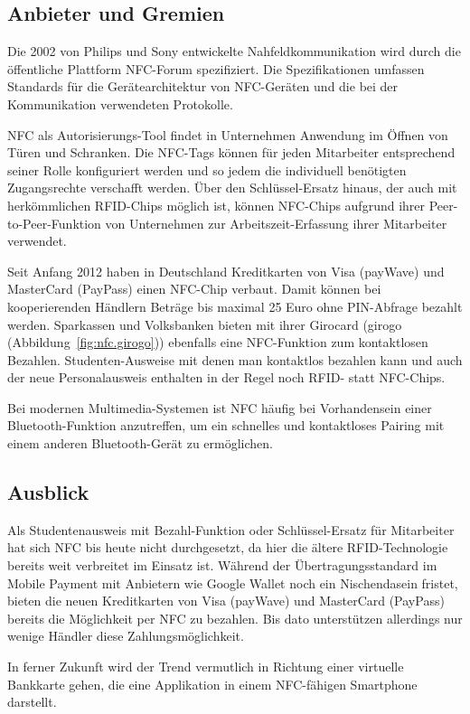 \begin{multicols}{3}

\subsection*{Anbieter und Gremien}
Die 2002 von Philips und Sony entwickelte Nahfeldkommunikation wird durch die öffentliche Plattform NFC-Forum spezifiziert. Die Spezifikationen umfassen Standards für die Gerätearchitektur von NFC-Geräten und die bei der Kommunikation verwendeten Protokolle.

NFC als Autorisierungs-Tool findet in Unternehmen Anwendung im Öffnen von Türen und Schranken. Die NFC-Tags können für jeden Mitarbeiter entsprechend seiner Rolle konfiguriert werden und so jedem die individuell benötigten Zugangsrechte verschafft werden. Über den Schlüssel-Ersatz hinaus, der auch mit herkömmlichen RFID-Chips möglich ist, können NFC-Chips aufgrund ihrer Peer-to-Peer-Funktion von Unternehmen zur Arbeitszeit-Erfassung ihrer Mitarbeiter verwendet.

Seit Anfang 2012 haben in Deutschland Kreditkarten von Visa (payWave) und MasterCard (PayPass) einen NFC-Chip verbaut. Damit können bei kooperierenden Händlern Beträge bis maximal 25 Euro ohne PIN-Abfrage bezahlt werden. Sparkassen und Volksbanken bieten mit ihrer Girocard (girogo (Abbildung~\ref{fig:nfc.girogo})) ebenfalls eine NFC-Funktion zum kontaktlosen Bezahlen.
Studenten-Ausweise mit denen man kontaktlos bezahlen kann und auch der neue Personalausweis enthalten in der Regel noch RFID- statt NFC-Chips.

Bei modernen Multimedia-Systemen ist NFC häufig bei Vorhandensein einer Bluetooth-Funktion anzutreffen, um ein schnelles und kontaktloses Pairing mit einem anderen Bluetooth-Gerät zu ermöglichen.~\cite{nfc.2,nfc.11,nfc.12}


\subsection*{Ausblick}
Als Studentenausweis mit Bezahl-Funktion oder Schlüssel-Ersatz für Mitarbeiter hat sich NFC bis heute nicht durchgesetzt, da hier die ältere RFID-Technologie bereits weit verbreitet im Einsatz ist. Während der Übertragungsstandard im Mobile Payment mit Anbietern wie Google Wallet noch ein Nischendasein fristet, bieten die neuen Kreditkarten von Visa (payWave) und MasterCard (PayPass) bereits die Möglichkeit per NFC zu bezahlen. Bis dato unterstützen allerdings nur wenige Händler diese Zahlungsmöglichkeit.

In ferner Zukunft wird der Trend vermutlich in Richtung einer virtuelle Bankkarte gehen, die eine Applikation in einem NFC-fähigen Smartphone darstellt.~\cite{nfc.2}




\printbibliography[segment=10,heading=subbibliography]

\end{multicols}
\newpage